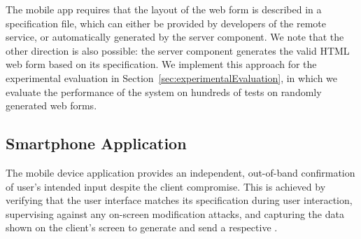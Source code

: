 The mobile app requires that the layout of the web form is described in a specification file, which can either be provided by developers of the remote service, or automatically generated by the \sysname server component.
We note that the other direction is also possible: the server component generates the valid HTML web form based on its specification.
We implement this approach for the experimental evaluation in Section~\ref{sec:experimentalEvaluation}, in which we evaluate the performance of the system on hundreds of tests on randomly generated web forms.





\subsection{\sysname Smartphone Application} \label{sec:systemDesign:phone}

The mobile device application provides an independent, out-of-band confirmation of user's intended input despite the client compromise.
This is achieved by verifying that the user interface matches its specification during user interaction, supervising against any on-screen modification attacks, and capturing the data shown on the client's screen to generate and send a respective \POI.

